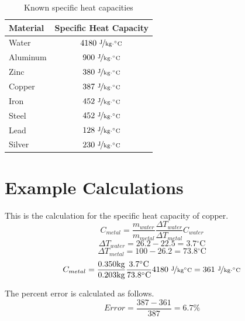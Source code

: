 \documentclass{article}
\begin{document}
\begin{table}[htbp]
\begin{center}
\footnotesize
\begin{tabular}{lc}
\toprule
 Material  & Specific Heat Capacity \\                                                      
\midrule
  
    Water   & $4180\  \nicefrac{ \text{J}}{\text{kg}\cdot {}^{\circ}\text{C}}$       \\
    Aluminum   & $900\   \nicefrac{ \text{J}}{\text{kg}\cdot {}^{\circ}\text{C}}$       \\
    Zinc     & $380\  \nicefrac{ \text{J}}{\text{kg}\cdot {}^{\circ}\text{C}}$      \\
     Copper     & $387\   \nicefrac{ \text{J}}{\text{kg}\cdot {}^{\circ}\text{C}}$      \\
     Iron     & $452\   \nicefrac{ \text{J}}{\text{kg}\cdot {}^{\circ}\text{C}}$      \\
     Steel     & $452\   \nicefrac{ \text{J}}{\text{kg}\cdot {}^{\circ}\text{C}}$      \\
     Lead     & $128\   \nicefrac{ \text{J}}{\text{kg}\cdot {}^{\circ}\text{C}}$      \\
     Silver     & $230\   \nicefrac{ \text{J}}{\text{kg}\cdot {}^{\circ}\text{C}}$      \\
    
\bottomrule
\end{tabular}
\end{center}
  \caption{Known specific heat capacities}
  \label{tab:font-sizes}
\end{table}

\newpage

\section{Example Calculations}
This is the calculation for the specific heat capacity of copper.
$$C_{metal}=\frac{m_{water}}{m_{metal}}  \frac{\Delta T_{water}}{\Delta T_{metal}}    C_{water}$$
$$\Delta T_{water}=26.2-22.5=3.7 {}^{\circ}\text{C}$$
$$\Delta T_{metal}=100-26.2=73.8 {}^{\circ}\text{C}$$
$$C_{metal}=\frac{0.350 \text{kg}}{0.203 \text{kg}}  \frac{3.7  {}^{\circ}\text{C}}{73.8  {}^{\circ}\text{C}}    4180\  \nicefrac{ \text{J}}{\text{kg} {}^{\circ}\text{C}}=361\  \nicefrac{ \text{J}}{\text{kg}\cdot {}^{\circ}\text{C}}$$

The percent error is calculated as follows.
$$Error=\frac{387-361}{387}=6.7\%$$
\end{document}
